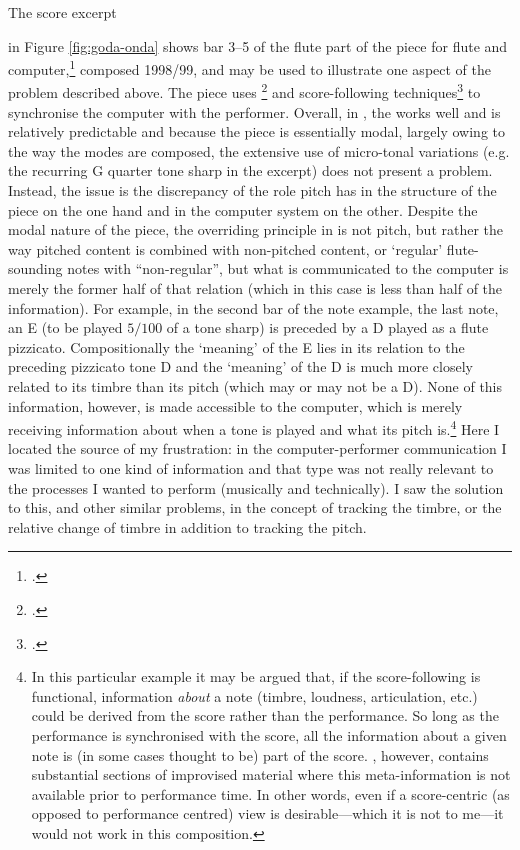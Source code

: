 \hypertarget{sec:target:personal-background-4}{The score excerpt} in Figure \ref{fig:goda-onda} shows bar 3--5 of the flute part of the piece  for flute and computer,\footcite[][]{goda-onda} composed 1998/99, and may be used to illustrate one aspect of the problem described above. The piece uses \footcite[The pitch-tracking is achieved with the \emph{fiddle\~} object in Max/MSP. See][]{puckette98} and score-following techniques\footcite[For an overview of score-following techniques, see][chap. 3.2]{rowe} to synchronise the computer with the performer. Overall, in , the  works well and is relatively predictable and because the piece is essentially modal, largely owing to the way the modes are composed, the extensive use of micro-tonal variations (e.g. the recurring G quarter tone sharp in the excerpt) does not present a problem. Instead, the issue is the discrepancy of the role pitch has in the structure of the piece on the one hand and in the computer system on the other. Despite the modal nature of the piece, the overriding principle in  is not pitch, but rather the way pitched content is combined with non-pitched content, or `regular' flute-sounding notes with ``non-regular'', but what is communicated to the computer is merely the former half of that relation (which in this case is less than half of the information). For example, in the second bar of the note example, the last note, an E (to be played $5/100$ of a tone sharp) is preceded by a D played as a flute pizzicato. Compositionally the `meaning' of the E lies in its relation to the preceding pizzicato tone D and the `meaning' of the D is much more closely related to its timbre than its pitch (which may or may not be a D). None of this information, however, is made accessible to the computer, which is merely receiving information about when a tone is played and what its pitch is.\footnote{In this particular example it may be argued that, if the score-following is functional, information \emph{about} a note (timbre, loudness, articulation, etc.) could be derived from the score rather than the performance. So long as the performance is synchronised with the score, all the information about a given note is (in some cases thought to be) part of the score. , however, contains substantial sections of improvised material where this meta-information is not available prior to performance time. In other words, even if a score-centric (as opposed to performance centred) view is desirable---which it is not to me---it would not work in this composition.} \hypertarget{sec:target:personal-background-2}{Here I located} the source of my frustration: in the computer-performer communication I was limited to one kind of information and that type was not really relevant to the processes I wanted to perform (musically and technically). I saw the solution to this, and other similar problems, in the concept of tracking the timbre, or the relative change of timbre in addition to tracking the pitch.

